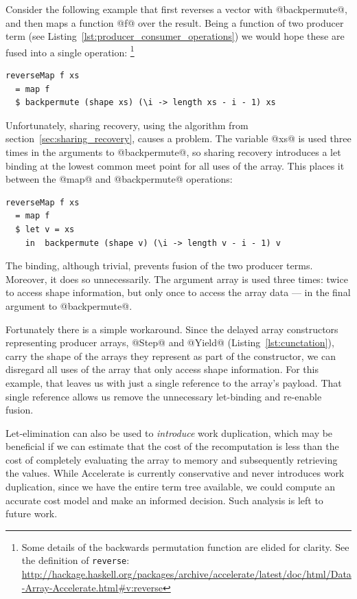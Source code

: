 Consider the following example that first reverses a vector with @backpermute@,
and then maps a function @f@ over the result. Being a function of two producer
term (see Listing~\ref{lst:producer_consumer_operations}) we would hope these
are fused into a single operation:%
\footnote{Some details of the backwards permutation function are elided for
clarity. See the definition of \texttt{reverse}:
\url{http://hackage.haskell.org/packages/archive/accelerate/latest/doc/html/Data-Array-Accelerate.html\#v:reverse}}
%
\begin{lstlisting}[style=haskell]
reverseMap f xs
  = map f
  $ backpermute (shape xs) (\i -> length xs - i - 1) xs
\end{lstlisting}
%
Unfortunately, sharing recovery, using the algorithm from
section~\ref{sec:sharing_recovery}, causes a problem. The variable @xs@
is used three times in the arguments to @backpermute@, so sharing recovery
introduces a let binding at the lowest common meet point for all uses of the
array. This places it between the @map@ and @backpermute@ operations:
%
\begin{lstlisting}[style=haskell]
reverseMap f xs
  = map f
  $ let v = xs
    in  backpermute (shape v) (\i -> length v - i - 1) v
\end{lstlisting}
%
The binding, although trivial, prevents fusion of the two producer terms.
Moreover, it does so unnecessarily. The argument array is used three times:
twice to access shape information, but only once to access the array data ---
in the final argument to @backpermute@.

Fortunately there is a simple workaround. Since the delayed array constructors
representing producer arrays, @Step@ and @Yield@ (Listing~\ref{lst:cunctation}),
carry the shape of the arrays they represent as part of the constructor, we can
disregard all uses of the array that only access shape information. For this
example, that leaves us with just a single reference to the array's payload.
That single reference allows us remove the unnecessary let-binding and re-enable
fusion.

Let-elimination can also be used to \emph{introduce} work duplication, which may
be beneficial if we can estimate that the cost of the recomputation is less than
the cost of completely evaluating the array to memory and subsequently
retrieving the values. While Accelerate is currently conservative and never
introduces work duplication, since we have the entire term tree available, we
could compute an accurate cost model and make an informed decision. Such
analysis is left to future work.


